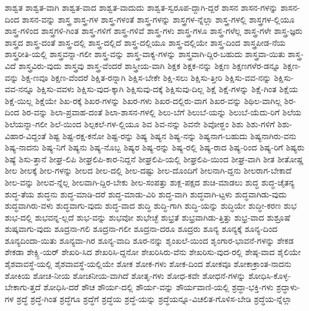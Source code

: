{ಶಾಶ್ವತ
ಶಾಶ್ವತ-ವಾಗಿ
ಶಾಶ್ವತ-ವಾದ
ಶಾಶ್ವತ-ವಾದುದು
ಶಾಶ್ವತ-ಸ್ವರೂಪ-ದ್ದಾಗಿ-ದ್ದರೆ
ಶಾಸನ
ಶಾಸನ-ಗಳನ್ನು
ಶಾಸನ-ದಿಂದ
ಶಾಸನ-ವನ್ನು
ಶಾಸ್ತ್ರ
ಶಾಸ್ತ್ರ-ಗಳ
ಶಾಸ್ತ್ರ-ಗಳಂತೆ
ಶಾಸ್ತ್ರ-ಗಳನ್ನು
ಶಾಸ್ತ್ರಗಳ-ನ್ನೆಲ್ಲಾ
ಶಾಸ್ತ್ರ-ಗಳಲ್ಲಿ
ಶಾಸ್ತ್ರಗಳ-ಲ್ಲಿಯೂ
ಶಾಸ್ತ್ರ-ಗಳಿಂದ
ಶಾಸ್ತ್ರಗಳಿ-ಗಿಂತ
ಶಾಸ್ತ್ರ-ಗಳಿಗೆ
ಶಾಸ್ತ್ರ-ಗಳಿವೆ
ಶಾಸ್ತ್ರ-ಗಳು
ಶಾಸ್ತ್ರ-ಗಳೂ
ಶಾಸ್ತ್ರ-ಗಳೆಲ್ಲ
ಶಾಸ್ತ್ರ-ಗಳೇ
ಶಾಸ್ತ್ರ-ಜ್ಞರು
ಶಾಸ್ತ್ರದ
ಶಾಸ್ತ್ರ-ದಂತೆ
ಶಾಸ್ತ್ರ-ದಲ್ಲಿ
ಶಾಸ್ತ್ರ-ದಲ್ಲಿದೆ
ಶಾಸ್ತ್ರ-ದಲ್ಲಿಯೂ
ಶಾಸ್ತ್ರ-ದಲ್ಲಿಯೇ
ಶಾಸ್ತ್ರ-ದಿಂದ
ಶಾಸ್ತ್ರಪೀಡ-ನೆಯ
ಶಾಸ್ತ್ರರೀತಿ-ಯಲ್ಲಿ
ಶಾಸ್ತ್ರವನ್ನಾ-ಗಲೀ
ಶಾಸ್ತ್ರ-ವನ್ನು
ಶಾಸ್ತ್ರ-ವಾಕ್ಯ-ಗಳನ್ನು
ಶಾಸ್ತ್ರವಾಗಿ-ದ್ದಿರ-ಬಹುದು
ಶಾಸ್ತ್ರವಾ-ಯಿತು
ಶಾಸ್ತ್ರ-ವಿದೆ
ಶಾಸ್ತ್ರವಿರು-ವುದು
ಶಾಸ್ತ್ರವು
ಶಾಸ್ತ್ರ-ವೆಂದರೆ
ಶಾಸ್ತ್ರೀಯ-ವಾಗಿ
ಶಿಕ್ಷಕ
ಶಿಕ್ಷಕ-ನನ್ನು
ಶಿಕ್ಷಣ
ಶಿಕ್ಷಣಗಳೆರ-ಡನ್ನೂ
ಶಿಕ್ಷಣ-ವನ್ನು
ಶಿಕ್ಷ-ಣವೂ
ಶಿಕ್ಷಣ-ವೆಂದರೆ
ಶಿಕ್ಷಿತ-ರನ್ನಾಗಿ
ಶಿಕ್ಷಿಸ-ಬೇಕೇ
ಶಿಕ್ಷಿ-ಸಲು
ಶಿಕ್ಷಿಸು-ತ್ತೀರಿ
ಶಿಕ್ಷಿಸು-ವವ-ನನ್ನು
ಶಿಕ್ಷಿಸು-ವವ-ನನ್ನೂ
ಶಿಕ್ಷಿಸು-ವವಳು
ಶಿಕ್ಷಿಸು-ವುದ-ಕ್ಕಾಗಿ
ಶಿಕ್ಷಿಸುವು-ದಕ್ಕೆ
ಶಿಕ್ಷಿಸುವು-ದಿಲ್ಲ
ಶಿಕ್ಷೆ
ಶಿಕ್ಷೆ-ಗಳನ್ನು
ಶಿಕ್ಷೆ-ಗಿಂತ
ಶಿಕ್ಷೆಯ
ಶಿಕ್ಷೆ-ಯಿಲ್ಲ
ಶಿಕ್ಷೆಯೇ
ಶಿಖ-ರಕ್ಕೆ
ಶಿಖರ-ಗಳನ್ನು
ಶಿಖರ-ಗಳು
ಶಿಖರ-ದಲ್ಲಿರು-ವಾಗ
ಶಿಖರ-ವನ್ನು
ಶಿಥಿಲ-ವಾಗಿಲ್ಲ
ಶಿರ-ದಿಂದ
ಶಿರ-ವನ್ನು
ಶಿಲಾ-ಪ್ರವಾಹ-ದಂತೆ
ಶಿಲಾ-ಶಾಸನ-ಗಳಲ್ಲಿ
ಶಿಲು-ಬೆಗೆ
ಶಿಲುಬೆ-ಯನ್ನು
ಶಿಲುಬೆ-ಯೆದು-ರಿಗೆ
ಶಿಲೆಯ
ಶಿಲೆಯನ್ನಾ-ಗಲೀ
ಶಿಲೆ-ಯಿಂದ
ಶಿಲ್ಪಕಲೆ-ಗಳ-ಲ್ಲಿಯೂ
ಶಿವ
ಶಿವ-ನನ್ನು
ಶಿವನೇ
ಶಿವೋಠ್ಹಂ
ಶಿಶು
ಶಿಶು-ಗಳಿಗೆ
ಶಿಶು-ವಿಹಾರ-ವಿದ್ದಂತೆ
ಶಿಷ್ಟ
ಶಿಷ್ಟ-ರಕ್ಷ-ಕನೋ
ಶಿಷ್ಟ-ರನ್ನು
ಶಿಷ್ಯ
ಶಿಷ್ಯನ
ಶಿಷ್ಯ-ನನ್ನು
ಶಿಷ್ಯನಾಗ-ಬಹುದು
ಶಿಷ್ಯನಾಗಿರು-ವನು
ಶಿಷ್ಯ-ನಾದನು
ಶಿಷ್ಯ-ನಿಗೆ
ಶಿಷ್ಯನು
ಶಿಷ್ಯ-ನೊಬ್ಬ
ಶಿಷ್ಯರ
ಶಿಷ್ಯ-ರನ್ನು
ಶಿಷ್ಯ-ರಲ್ಲಿ
ಶಿಷ್ಯ-ರಾದ
ಶಿಷ್ಯ-ರಿಂದ
ಶಿಷ್ಯ-ರಿಗೆ
ಶಿಷ್ಯರು
ಶಿಷ್ಯೆ
ಶಿಸು-ತ್ತಾನೆ
ಶೀಘ್ರ-ಲಿಪಿ
ಶೀಘ್ರಲಿಪಿ-ಕಾರ-ನಿದ್ದನೆ
ಶೀಘ್ರಲಿಪಿ-ಯಲ್ಲಿ
ಶೀಘ್ರಲಿಪಿ-ಯಿಂದ
ಶೀಘ್ರ-ವಾಗಿ
ಶೀತ
ಶೀತೋಷ್ಣ
ಶೀಲ
ಶೀಲಕ್ಕೆ
ಶೀಲ-ಗಳನ್ನು
ಶೀಲದ
ಶೀಲ-ದಲ್ಲಿ
ಶೀಲ-ದಷ್ಟು
ಶೀಲ-ದೊಂದಿಗೆ
ಶೀಲನಾಗಿ-ದ್ದನು
ಶೀಲರಾಗ-ಬೇಕಾದೆ
ಶೀಲ-ವನ್ನು
ಶೀಲವ-ನ್ನೆಲ್ಲ
ಶೀಲವಾಗಿ-ದ್ದಿರ-ಬೇಕು
ಶೀಲ-ಸಂಪತ್ತು
ಶುಕ್ಲ-ಪಕ್ಷದ
ಶುಚಿ-ಮಾಡಲು
ಶುದ್ಧ
ಶುದ್ಧ-ಚೈತನ್ಯ
ಶುದ್ಧ-ತೆಯ
ಶುದ್ಧನು
ಶುದ್ಧ-ಮಾಡಿ-ದರೆ
ಶುದ್ಧ-ಮಾಡು-ವಿರಿ
ಶುದ್ಧ-ವಾಗಿ
ಶುದ್ಧವಾಗಿ-ಟ್ಟಳು
ಶುದ್ಧವಾಗಿಡು-ವುದು
ಶುದ್ಧವಾಗಿರು-ವಳು
ಶುದ್ಧವಾಗು-ವುದು
ಶುದ್ಧ-ವಾದ
ಶುದ್ಧಿ
ಶುದ್ಧಿ-ಗಾಗಿ
ಶುದ್ಧಿ-ಯನ್ನು
ಶುದ್ಧಿಯೇ
ಶುದ್ಧೀ-ಕರಣ
ಶುಭ
ಶುಭ-ದಲ್ಲಿ
ಶುಭವನ್ನ-ಲ್ಲದೆ
ಶುಭ-ವನ್ನು
ಶುಭವೋ
ಶುಭೇಚ್ಛೆ
ಶುಭ್ರತೆ
ಶುಭ್ರವಾಗಿಡು-ತ್ತಿತ್ತು
ಶುಭ್ರ-ವಾದ
ಶುಶ್ರೂಷೆ
ಶುಷ್ಕವಾಗು-ವುದು
ಶೂದ್ರನಾ-ಗಲಿ
ಶೂದ್ರನಾ-ಗಲೀ
ಶೂದ್ರನಾ-ದರೂ
ಶೂದ್ರರು
ಶೂನ್ಯ
ಶೂನ್ಯಕ್ಕೆ
ಶೂನ್ಯ-ದಿಂದ
ಶೂನ್ಯದಿಂದಾ-ಯಿತು
ಶೂನ್ಯವಾ-ಗಿರ
ಶೂನ್ಯ-ವಾದಿ
ಶೂರ-ನನ್ನು
ಶೃಂಖಲೆ-ಯಿಂದ
ಶೃಂಗಾರ-ಭಾವನೆ-ಗಳನ್ನು
ಶೇಕಡ
ಶೇಕಡಾ
ಶೇಕ್ಸ್ಪಿ-ಯರ್
ಶೇಖರಿ-ಸಿದ
ಶೇಖರಿಸಿ-ದ್ದನೋ
ಶೇಖರಿಸಿರು-ವೆನು
ಶೇಖರಿಸು-ವುದ-ರಲ್ಲಿ
ಶೇಷ್ಠ-ವಾದ
ಶೈಲಿಯೇ
ಶೈಶವಾವಸ್ಥೆ-ಯಲ್ಲಿ
ಶೈಶವಾವಸ್ಥೆ-ಯಲ್ಲಿಯೇ
ಶೋಕ
ಶೋಕ-ಗಳು
ಶೋಕ-ದಿಂದ
ಶೋಕವೂ
ಶೋಕಾಕ್ರಾಂತ-ನಾದನು
ಶೋಕಿಯ
ಶೋಚ-ನೀಯ
ಶೋಚನೀಯ-ವಾಗಿದೆ
ಶೋತೃ-ಗಳು
ಶೋಧ-ಕವೇ
ಶೋಧನೆ-ಗಳನ್ನು
ಶೋಧಿಸಿ-ಕೊಳ್ಳ-ಬೇಕಾಗು-ತ್ತದೆ
ಶೋಧಿಸಿ-ದರೆ
ಶೌಚ
ಶೌರ್ಯ-ದಲ್ಲಿ
ಶೌರ್ಯ-ವನ್ನು
ಶೌರ್ಯವಾಣಿ-ಯಲ್ಲಿ
ಶ್ರದ್ಧಾ-ಭಕ್ತಿ-ಗಳು
ಶ್ರದ್ಧಾಳು-ಗಳ
ಶ್ರದ್ಧೆ
ಶ್ರದ್ಧೆ-ಗಿಂತ
ಶ್ರದ್ಧೆಗೂ
ಶ್ರದ್ಧೆಗೆ
ಶ್ರದ್ಧೆಯ
ಶ್ರದ್ಧೆ-ಯನ್ನು
ಶ್ರದ್ಧೆಯನ್ನೂ-ವಿಚಲಿತ-ಗೊಳಿಸ-ಬೇಡಿ
ಶ್ರದ್ಧೆಯ-ನ್ನೆಲ್ಲಾ
}
